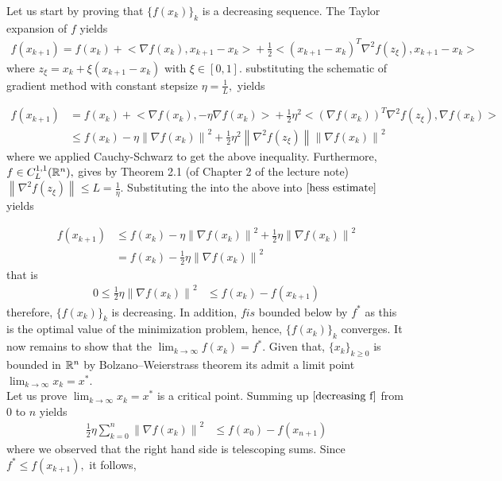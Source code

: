 \documentclass{ExerciseSheet}
\begin{document}
\begin{solution}
Let us start by proving that $\{f(x_k)\}_k$ is a decreasing sequence. The Taylor expansion of $f$ yields
\begin{align*}
    f(x_{k+1}) = f(x_k)+ \big< \nabla f(x_k), x_{k+1}-x_k \big> +\frac{1}{2} \big<(x_{k+1}-x_k)^T \nabla^2 f(z_{\xi}), x_{k+1}-x_k \big>
\end{align*}
where $z_{\xi}=x_k + \xi(x_{k+1}-x_k)$ with $\xi\in [0, 1].$
substituting the schematic of gradient method with constant  stepsize $\eta=\frac{1}{L},$ yields

  \begin{align}
    f(x_{k+1}) &= f(x_k)+ \big< \nabla f(x_k), -\eta\nabla f(x_k) \big> +\frac{1}{2}\eta^2 \big<(\nabla f(x_k))^T \nabla^2 f(z_{\xi}), \nabla f(x_k) \big>\nonumber\\
    &\leq f(x_k) -\eta\left\|\nabla f(x_k)\right\|^2 +\frac{1}{2}\eta^2\left\|\nabla^2 f(z_{\xi})\right\|\left\|\nabla f(x_k)\right\|^2 \label{hess estimate}
 \end{align}
where we applied Cauchy-Schwarz to get the above inequality. Furthermore, $f \in C^{1,1}_L(\mathbb{R}^n),$ gives by Theorem 2.1 (of Chapter 2 of the lecture note) $\left\|\nabla^2 f(z_{\xi})\right\|\leq L=\frac{1}{\eta}.$ Substituting the into the above into $\eqref{hess estimate}$ yields

  \begin{align*}
    f(x_{k+1})&\leq f(x_k) -\eta\left\|\nabla f(x_k)\right\|^2 +\frac{1}{2}\eta\left\|\nabla f(x_k)\right\|^2\\
    &=f(x_k) -\frac{1}{2}\eta\left\|\nabla f(x_k)\right\|^2
 \end{align*}
that is
 \begin{align}
   0\leq \frac{1}{2}\eta\left\|\nabla f(x_k)\right\|^2&\leq f(x_k) - f(x_{k+1}) \label{decreasing f}
 \end{align}
therefore,  $\{f(x_k)\}_k$ is decreasing. In addition, $f is$ bounded below by $f^*$ as this is the optimal value of the minimization problem, hence, $\{f(x_k)\}_k$ converges. It now remains to show that the $\displaystyle \lim_{k\to\infty}f(x_k)=f^*.$ Given that,  $\{ x_k\}_{k \geq0}$ is bounded in $\mathbb{R}^n$ by Bolzano–Weierstrass theorem its admit a limit point $\displaystyle\lim_{k\to\infty}x_k=x^*$.\\
Let us prove $\displaystyle\lim_{k\to\infty}x_k=x^*$ is a critical point.
 Summing up $\eqref{decreasing f}$ from $0$ to $n$ yields
  \begin{align*}
      \frac{1}{2}\eta\sum_{k=0}^{n}\left\|\nabla f(x_k)\right\|^2&\leq f(x_0) - f(x_{n+1})
  \end{align*}
  where we observed that the right hand side is telescoping sums. Since $f^*\leq f(x_{k+1}),$ it follows,


\end{solution}
\end{document}
